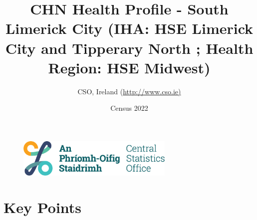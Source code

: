 \documentclass{article}
\title{CHN Health Profile - South Limerick City (IHA: HSE Limerick City and Tipperary North ;  Health Region: HSE Midwest) }
\date{Census 2022}
\author{CSO, Ireland  (\url{http://www.cso.ie)}}
\begin{document}


\begin{figure}
	\centering
\includegraphics[width =75mm]{../figures/CSO_Logo.png}
\end{figure}

				 
		   
						  
														  
																																													
												 
			 
\maketitle
					
													   
				 
						 
																																																																											   
				 
				  
  \pagebreak
    	    \tableofcontents

\pagebreak


\section{Key Points}
\end{document}
